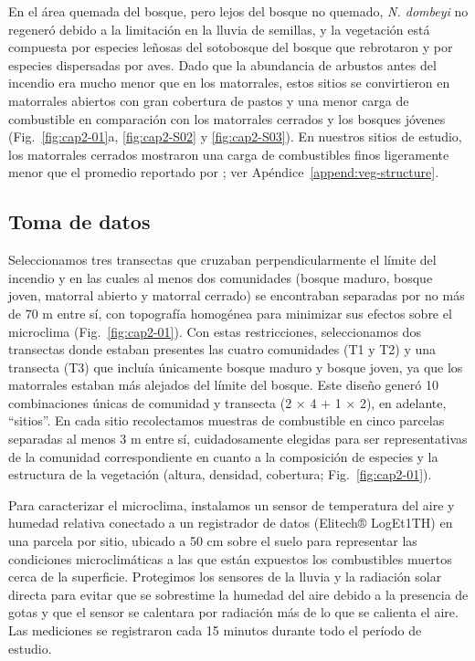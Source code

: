 En el área quemada del bosque, pero lejos del bosque no quemado, \textit{N. dombeyi} no regeneró debido a la limitación en la lluvia de semillas, y la vegetación está compuesta por especies leñosas del sotobosque del bosque que rebrotaron y por especies dispersadas por aves. Dado que la abundancia de arbustos antes del incendio era mucho menor que en los matorrales, estos sitios se convirtieron en matorrales abiertos con gran cobertura de pastos y una menor carga de combustible en comparación con los matorrales cerrados y los bosques jóvenes (Fig.~\ref{fig:cap2-01}a, \ref{fig:cap2-S02} y \ref{fig:cap2-S03}). En nuestros sitios de estudio, los matorrales cerrados mostraron una carga de combustibles finos ligeramente menor que el promedio reportado por \citet{tiribelli_changes_2018}; ver Apéndice~\ref{append:veg-structure}.

\subsection{Toma de datos}

Seleccionamos tres transectas que cruzaban perpendicularmente el límite del incendio y en las cuales al menos dos comunidades (bosque maduro, bosque joven, matorral abierto y matorral cerrado) se encontraban separadas por no más de 70 m entre sí, con topografía homogénea para minimizar sus efectos sobre el microclima (Fig.~\ref{fig:cap2-01}). Con estas restricciones, seleccionamos dos transectas donde estaban presentes las cuatro comunidades (T1 y T2) y una transecta (T3) que incluía únicamente bosque maduro y bosque joven, ya que los matorrales estaban más alejados del límite del bosque. Este diseño generó 10 combinaciones únicas de comunidad y transecta (2 $\times$ 4 $+$ 1 $\times$ 2), en adelante, ``sitios''. En cada sitio recolectamos muestras de combustible en cinco parcelas separadas al menos 3 m entre sí, cuidadosamente elegidas para ser representativas de la comunidad correspondiente en cuanto a la composición de especies y la estructura de la vegetación (altura, densidad, cobertura; Fig.~\ref{fig:cap2-01}).

Para caracterizar el microclima, instalamos un sensor de temperatura del aire y humedad relativa conectado a un registrador de datos (Elitech® LogEt1TH) en una parcela por sitio, ubicado a 50 cm sobre el suelo para representar las condiciones microclimáticas a las que están expuestos los combustibles muertos cerca de la superficie. Protegimos los sensores de la lluvia y la radiación solar directa para evitar que se sobrestime la humedad del aire debido a la presencia de gotas y que el sensor se calentara por radiación más de lo que se calienta el aire. Las mediciones se registraron cada 15 minutos durante todo el período de estudio.

